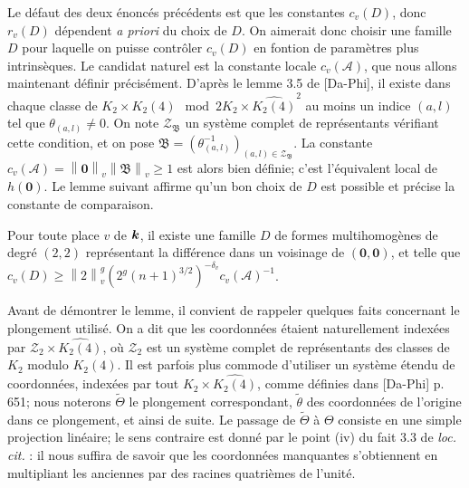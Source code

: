 \documentclass[11pt, twoside, a4paper, french]{article}
\numberwithin{equation}{section}
\newcommand{\lat}[1]{\emph{#1}} \newcommand{\pmm}[1]{\ \text{#1}}
\renewcommand{\ge}{\geqslant} \renewcommand{\le}{\leqslant}
\newcommand{\nv}[2][v]{\left\lVert#2\right\rVert_{#1}} 		%
\newcommand{\dv}{{\delta_v}} 					%
\newcommand{\A}{\mathcal{A}} 					%
\newcommand{\p}[1]{{\boldsymbol{#1}}} 				%
\newcommand{\OA}{\p{0}} 					%
\newcommand{\coa}{\theta} 					%
\newcommand{\BA}{\mathfrak{B}} 					%
\begin{document}
Le défaut des deux énoncés précédents est que les constantes $c_v(D)$, donc $r_v(D)$ dépendent \lat{a priori} du choix de $D$. On aimerait donc choisir une famille $D$ pour laquelle on puisse contrôler $c_v(D)$ en fontion de paramètres plus intrinsèques. Le candidat naturel est la constante locale $c_v(\A)$, que nous allons maintenant définir précisément. D'après le lemme 3.5 de [Da-Phi], il existe dans chaque classe de $K_2 \times \widehat{K_2(4)} \mod 2K_2 \times \widehat{K_2(4)}^2$ au moins un indice $(a, l)$ tel que $\coa_{(a,l)} \neq 0$. On note $\mathcal{Z}_\BA$ un système complet de représentants vérifiant cette condition, et on pose $\BA = (\coa_{(a, l)}^{-1})_{(a, l) \in \mathcal{Z}_\BA}$. La constante $c_v(\A) = \nv{\OA}\nv{\BA} \ge 1$ est alors bien définie; c'est l'équivalent local de $h(\OA)$. Le lemme suivant affirme qu'un bon choix de $D$ est possible et précise la constante de comparaison.

\begin{lem} \label{RayonAbs}
Pour toute place $v$ de $\boldsymbol{k}$, il existe une famille $D$ de formes multihomogènes de degré $(2, 2)$ représentant la différence dans un voisinage de $(\OA, \OA)$, et telle que $c_v(D) \ge \nv{2}^g(2^g(n+1)^{3/2})^{-\dv} c_v(\A)^{-1}$.
\end{lem}

Avant de démontrer le lemme, il convient de rappeler quelques faits concernant le plongement utilisé. On a dit que les coordonnées étaient naturellement indexées par $\mathcal{Z}_2 \times \widehat{K_2(4)}$, où $\mathcal{Z}_2$ est un système complet de représentants des classes de $K_2$ modulo $K_2(4)$. Il est parfois plus commode d'utiliser un système étendu de coordonnées, indexées par tout $K_2 \times \widehat{K_2(4)}$, comme définies dans [Da-Phi] p. 651; nous noterons $\tilde{\Theta}$ le plongement correspondant, $\tilde{\coa}$ des coordonnées de l'origine dans ce plongement, et ainsi de suite. Le passage de $\tilde{\Theta}$ à $\Theta$ consiste en une simple projection linéaire; le sens contraire est donné par le point (iv) du fait 3.3 de \lat{loc. cit.} : il nous suffira de savoir que les coordonnées manquantes s'obtiennent en multipliant les anciennes par des racines quatrièmes de l'unité.
\end{document}
